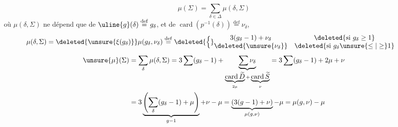 \[
\mu(\Sigma)=\sum_{\delta\in\Delta}\mu(\delta,\Sigma)
\]
où $\mu(\delta,\Sigma)$ ne dépend que de
$\uline{g}(\delta)\overset{\mathrm{def}}=g_\delta$, et de
$\operatorname{card}(p^{-1}(\delta))\overset{\mathrm{def}}=\nu_\delta$,
\[
\begin{aligned}
\mu(\delta,\Sigma)&=
\deleted{\unsure{\xi(g_\delta)}}
\mu(g_\delta,\nu_\delta)
\overset{\mathrm{def}}=
\deleted{\Big\{}
\begin{matrix}
3(g_\delta-1)+\nu_\delta&
\deleted{\text{si }g_\delta\geq1}\\
\deleted{\unsure{\nu_\delta}}&
\deleted{\text{si }g_\delta\unsure{\leq|\geq}1}
\end{matrix}
\end{aligned}
\]
\[
\begin{aligned}
\unsure{\mu}(\Sigma)
&=\sum_\delta\mu(\delta,\Sigma)
=3\sum(g_\delta-1)
+\underbrace{\sum\nu_\delta}_{
\underbrace{\operatorname{card}\widetilde D}_{2\mu}
+\underbrace{\operatorname{card}\widetilde S}_{\nu}}
=3\sum(g_\delta-1)+2\mu+\nu\\
&=3\underbrace{\left(\sum_\delta(g_\delta-1)+\mu\right)}_{g-1}
+\nu-\mu
=\underbrace{(3(g-1)+\nu)}_{\mu(g,\nu)}-\mu
=\mu(g,\nu)-\mu
\end{aligned}
\]

